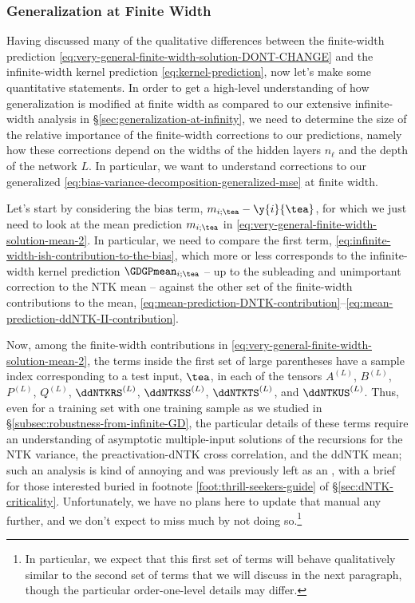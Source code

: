 \subsubsection{Generalization at Finite Width}
Having discussed many of the qualitative differences between the finite-width prediction \eqref{eq:very-general-finite-width-solution-DONT-CHANGE} and the infinite-width kernel prediction \eqref{eq:kernel-prediction}, now let's  make some quantitative statements. In order to get a high-level understanding of how generalization is modified at finite width as compared to our extensive infinite-width analysis in \S\ref{sec:generalization-at-infinity},  we need to determine the size of the relative importance of the finite-width corrections to our predictions, namely how these corrections depend on the widths of the hidden layers $n_\ell$ and the depth of the network $L$. In particular, we want to understand corrections to our generalized  \eqref{eq:bias-variance-decomposition-generalized-mse} at finite width.




Let's start by considering the bias term, $m_{i;\tea} - \y{i}{\tea}$, for which we just need to look at the mean prediction $m_{i;\tea}$ in  \eqref{eq:very-general-finite-width-solution-mean-2}. In particular, we need to compare the first term, \eqref{eq:infinite-width-ish-contribution-to-the-bias},
which more or less corresponds to the infinite-width kernel prediction $\GDGPmean_{i;\tea}$ -- up to the subleading and unimportant correction to the NTK mean --
against the other set of the finite-width contributions to the mean, \eqref{eq:mean-prediction-DNTK-contribution}--\eqref{eq:mean-prediction-ddNTK-II-contribution}. 

Now, among the finite-width contributions in \eqref{eq:very-general-finite-width-solution-mean-2}, 
the terms inside the first set of large parentheses have a sample index corresponding to a test input, $\tea$, in each of the tensors $A^{(L)}$, $B^{(L)}$, $P^{(L)}$, $Q^{(L)}$, $\ddNTKRS^{(L)}$, $\ddNTKSS^{(L)}$, $\ddNTKTS^{(L)}$, and $\ddNTKUS^{(L)}$. 
Thus, even for a training set with one training sample as we studied in \S\ref{subsec:robustness-from-infinite-GD}, the particular details of these terms require an understanding of asymptotic multiple-input solutions of the recursions for the NTK variance, the preactivation-dNTK cross correlation, and the ddNTK mean; such an analysis 
is kind of annoying and was previously left as an , with a brief  for those interested buried in footnote \ref{foot:thrill-seekers-guide} of \S\ref{sec:dNTK-criticality}.
Unfortunately, we have no plans here to update that manual any further, and we don't expect to miss much by not doing so.\footnote{In particular, we expect that this first set of terms will behave qualitatively similar to the second set of terms that we will discuss in the next paragraph, though the particular order-one-level details may differ.}




